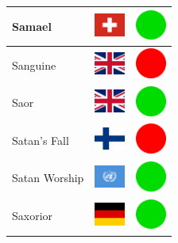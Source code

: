 \documentclass[12pt, a4paper, twoside]{report}
\begin{document}
\begin{center}
\begin{longtable}{|p{5cm}|p{2cm}|p{2cm}|}
 Samael                                                     & \includegraphics[width=1cm]{4x3/ch} &   \includegraphics[width=1cm]{likes/y} \\ \hline
 Sanguine                                                   & \includegraphics[width=1cm]{4x3/gb} &   \includegraphics[width=1cm]{likes/n} \\ \hline
 Saor                                                       & \includegraphics[width=1cm]{4x3/gb} &   \includegraphics[width=1cm]{likes/y} \\ \hline
 Satan's Fall                                               & \includegraphics[width=1cm]{4x3/fi} &   \includegraphics[width=1cm]{likes/n} \\ \hline
 Satan Worship                                              & \includegraphics[width=1cm]{4x3/un} &   \includegraphics[width=1cm]{likes/y} \\ \hline
 Saxorior                                                   & \includegraphics[width=1cm]{4x3/de} &   \includegraphics[width=1cm]{likes/y} \\ \hline

\end{longtable}
\end{center}
\end{document}
